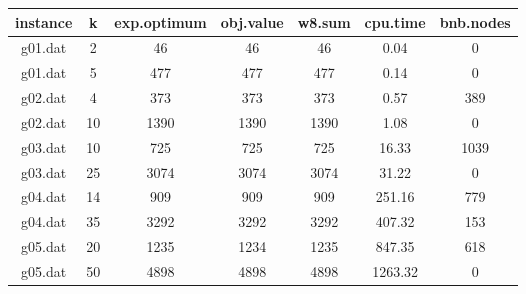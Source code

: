 \begin{tabular}{ c | c | c | c | c | c | c }
	instance & k & exp.optimum & obj.value & w8.sum & cpu.time & bnb.nodes \\ 
	\hline
	g01.dat & 2 & 46 & 46 & 46 & 0.04 & 0 \\
	g01.dat & 5 & 477 & 477 & 477 & 0.14 & 0 \\
	g02.dat & 4 & 373 & 373 & 373 & 0.57 & 389 \\
	g02.dat & 10 & 1390 & 1390 & 1390 & 1.08 & 0 \\
	g03.dat & 10 & 725 & 725 & 725 & 16.33 & 1039 \\
	g03.dat & 25 & 3074 & 3074 & 3074 & 31.22 & 0 \\
	g04.dat & 14 & 909 & 909 & 909 & 251.16 & 779 \\
	g04.dat & 35 & 3292 & 3292 & 3292 & 407.32 & 153 \\
	g05.dat & 20 & 1235 & 1234 & 1235 & 847.35 & 618 \\
	g05.dat & 50 & 4898 & 4898 & 4898 & 1263.32 & 0 \\
\end{tabular}

